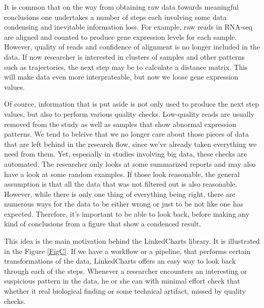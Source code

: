 \documentclass[twocolumn,10pt]{article}
\begin{document}
It is common that on the way from obtaining raw data towards meaningful conclusions one undertakes a number of steps each involving some data condensing and inevitable information loss. For example, raw reads in RNA-seq are aligned and counted to produce gene expression levels for each sample. However, quality of reads and confidence of alignment is no longer included in the data. If now researcher is interested in clusters of samples and other patterns such as trajectories, the next step may be to calculate a distance matrix. This will make data even more interprateable, but now we loose gene expression values. 

Of cource, information that is put aside is not only used to produce the next step values, but also to perform various quality checks. Low-quality reads are usually removed from the study as well as samples that show abnormal expression patterns. We tend to beleive that we no longer care about those pieces of data that are left behind in the research flow, since we've already taken everything we need from them. Yet, espesially in studies involving big data, these checks are automated. The researcher only looks at some summarized reports and may also have a look at some random examples. If those look reasonable, the general assumption is that all the data that was not filtered out is also reasonable. However, while there is only one thing of everything being right, there are numerous ways for the data to be either wrong or just to be not like one has expected. Therefore, it's important to be able to look back, before making any kind of conclusions from a figure that show a condenced result.

This idea is the main motivation behind the LinkedCharts library. It is illustrated in the Figure \ref{FigC}. If we have a workflow or a pipeline, that performs certain transformations of the data, LinkedCharts offers an easy way to look back through each of the steps. Whenever a researcher encounters an interesting or suspicious pattern in the data, he or she can with minimal effort check that whether it real biological finding or some technical artifact, missed by quality checks. 
\end{document}
